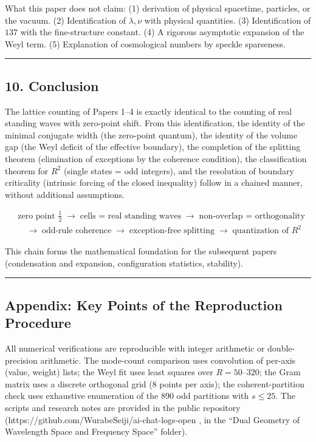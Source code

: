 \documentclass[
]{article}
\begin{document}
What this paper does not claim: (1) derivation of physical spacetime,
particles, or the vacuum. (2) Identification of \(\lambda,\nu\) with
physical quantities. (3) Identification of \(137\) with the
fine-structure constant. (4) A rigorous asymptotic expansion of the Weyl
term. (5) Explanation of cosmological numbers by speckle sparseness.

\begin{center}\rule{0.5\linewidth}{0.5pt}\end{center}

\subsection{10. Conclusion}\label{conclusion}

The lattice counting of Papers 1--4 is exactly identical to the counting
of real standing waves with zero-point shift. From this identification,
the identity of the minimal conjugate width (the zero-point quantum),
the identity of the volume gap (the Weyl deficit of the effective
boundary), the completion of the splitting theorem (elimination of
exceptions by the coherence condition), the classification theorem for
\(R^2\) (single states = odd integers), and the resolution of boundary
criticality (intrinsic forcing of the closed inequality) follow in a
chained manner, without additional assumptions.

\[
\begin{aligned}
&\text{zero point }\tfrac12\;\to\;\text{cells = real standing waves}\;\to\;\text{non-overlap = orthogonality}\\
&\quad\to\;\text{odd-rule coherence}\;\to\;\text{exception-free splitting}\;\to\;\text{quantization of }R^2
\end{aligned}
\]

This chain forms the mathematical foundation for the subsequent papers
(condensation and expansion, configuration statistics, stability).

\begin{center}\rule{0.5\linewidth}{0.5pt}\end{center}

\subsection{Appendix: Key Points of the Reproduction
Procedure}\label{appendix-key-points-of-the-reproduction-procedure}

All numerical verifications are reproducible with integer arithmetic or
double-precision arithmetic. The mode-count comparison uses convolution
of per-axis (value, weight) lists; the Weyl fit uses least squares over
\(R=50\)--\(320\); the Gram matrix uses a discrete orthogonal grid (8
points per axis); the coherent-partition check uses exhaustive
enumeration of the 890 odd partitions with \(s\le25\). The scripts and
research notes are provided in the public repository
(https://github.com/WurabeSeiji/ai-chat-logs-open , in the ``Dual
Geometry of Wavelength Space and Frequency Space'' folder).
\end{document}
